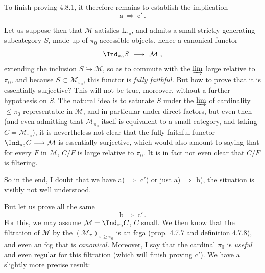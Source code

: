 To finish proving 4.8.1, it therefore remains to establish the implication
\[
\mathrm{a} \ \Longrightarrow \ \mathrm{c}' \, .
\]


Let us suppose then that $\mathcal{M}$ satisfies $\mathrm{L}_{\pi_0}$, and admits a small strictly generating subcategory $S$, made up of $\pi_0$-accessible objects, hence a canonical functor
\[
\Ind_{\pi_0}S \ \longrightarrow \ \mathcal{M} \ ,
\]
extending the inclusion $S\hookrightarrow\mathcal{M}$, so as to commute with the $\varinjlim$ large relative to $\pi_0$, and because $S\subset\mathcal{M}_{\pi_0}$, this functor is \textit{fully faithful.} But how to prove that it is essentially surjective? This will not be true, moreover, without a further hypothesis on $S$. The natural idea is to saturate $S$ under the $\varinjlim$
of cardinality $\leqslant\pi_0$ representable in $\mathcal{M}$, and in particular under direct factors, but even then (and even admitting that $\mathcal{M}_{\pi_0}$ itself is equivalent to a small category, and taking $C=\mathcal{M}_{\pi_0}$), it is nevertheless not clear that the fully faithful functor $\Ind_{\pi_0}C\longrightarrow\mathcal{M}$ is essentially surjective, which would also amount to saying that for every $F$ in $\mathcal{M}$, $C/F$ is large relative to $\pi_0$. It is in fact not even clear that $C/F$ is filtering.

So in the end, I doubt that we have a) $\Longrightarrow$ c$'$) or just a) $\Longrightarrow$ b), the situation is visibly not well understood.

But let us prove all the same
\[
\mathrm{b} \ \Longrightarrow \ \mathrm{c}' \, .
\]
For this, we may assume $\mathcal{M}=\Ind_{\pi_0}C$, $C$ small. We then know that the filtration of $\mathcal{M}$ by the $(\mathcal{M}_\pi)_{\pi\geqslant\pi_0}$ is an fcga (prop. 4.7.7 and definition 4.7.8), and even an fcg that is \textit{canonical.} Moreover, I say that the cardinal $\pi_0$ is \textit{useful} and even regular for this filtration (which will finish proving c$'$). We have a slightly more precise result:

